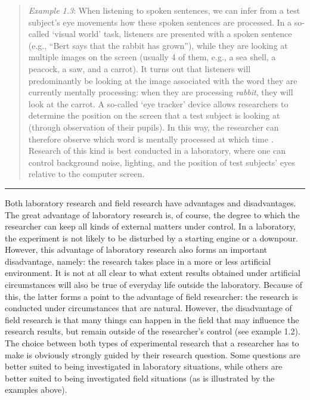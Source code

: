 \documentclass[
]{book}
\begin{document}
\begin{quote}
\emph{Example 1.3}: When listening to spoken sentences, we can infer from a test subject's eye movements how these spoken sentences are processed. In a so-called `visual world' task, listeners are presented with a spoken sentence (e.g., ``Bert says that the rabbit has grown''), while they are looking at multiple images on the screen (usually 4 of them, e.g., a sea shell, a peacock, a saw, and a carrot). It turns out that listeners will predominantly be looking at the image associated with the word they are currently mentally processing: when they are processing \emph{rabbit}, they will look at the carrot. A so-called `eye tracker' device allows researchers to determine the position on the screen that a test subject is looking at (through observation of their pupils). In this way, the researcher can therefore observe which word is mentally processed at which time \citep{KMR12}. Research of this kind is best conducted in a laboratory, where one can control background noise, lighting, and the position of test subjects' eyes relative to the computer screen.
\end{quote}

\begin{center}\rule{0.5\linewidth}{0.5pt}\end{center}

Both laboratory research and field research have advantages and disadvantages. The great advantage of laboratory research is, of course, the degree to which the researcher can keep all kinds of external matters under control. In a laboratory, the experiment is not likely to be disturbed by a starting engine or a downpour. However, this advantage of laboratory research also forms an important disadvantage, namely: the research takes place in a more or less artificial environment. It is not at all clear to what extent results obtained under artificial circumstances will also be true of everyday life outside the laboratory. Because of this, the latter forms a point to the advantage of field researcher: the research is conducted under circumstances that are natural. However, the disadvantage of field research is that many things can happen in the field that may influence the research results, but remain outside of the researcher's control (see example 1.2). The choice between both types of experimental research that a researcher has to make is obviously strongly guided by their research question. Some questions are better suited to being investigated in laboratory situations, while others are better suited to being investigated field situations (as is illustrated by the examples above).
\end{document}
